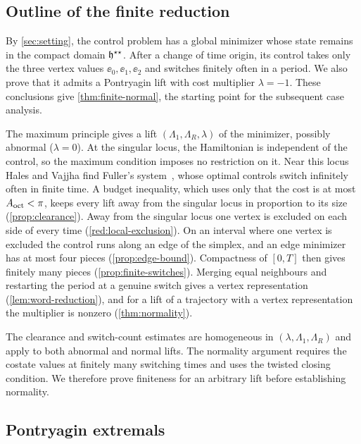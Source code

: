 \subsection{Outline of the finite reduction}\label{app:reduction-outline}

By \cref{sec:setting}, the control problem has a global minimizer whose state remains in the
compact domain $\mathfrak{h}^{\star\star}$. After a change of time origin, its control takes only the three
vertex values $\ee_0,\ee_1,\ee_2$ and switches finitely often in a period. We also prove that it
admits a Pontryagin lift with cost multiplier $\lambda=-1$. These conclusions give
\cref{thm:finite-normal}, the starting point for the subsequent case analysis.

The maximum principle gives a lift $(\Lambda_1,\Lambda_R,\lambda)$ of the minimizer, possibly
abnormal ($\lambda=0$). At the singular locus, the Hamiltonian is independent of the control, so
the maximum condition imposes no restriction on it. Near this locus Hales and Vajjha find Fuller's
system~\cite{HalesVajjha2024,Fuller1963}, whose optimal controls switch infinitely often in finite
time. A budget inequality, which uses only that the cost is at most $A_{\mathrm{oct}}<\pi$, keeps every lift
away from the singular locus in proportion to its size (\cref{prop:clearance}). Away from the
singular locus one vertex is excluded on each side of every time (\cref{red:local-exclusion}). On
an interval where one vertex is excluded the control runs along an edge of the simplex, and an
edge minimizer has at most four pieces (\cref{prop:edge-bound}). Compactness of $[0,T]$ then gives
finitely many pieces (\cref{prop:finite-switches}). Merging equal neighbours and restarting the
period at a genuine switch gives a vertex representation (\cref{lem:word-reduction}), and for a
lift of a trajectory with a vertex representation the multiplier is nonzero
(\cref{thm:normality}).

The clearance and switch-count estimates are homogeneous in $(\lambda,\Lambda_1,\Lambda_R)$ and
apply to both abnormal and normal lifts. The normality argument requires the costate values at
finitely many switching times and uses the twisted closing condition. We therefore prove
finiteness for an arbitrary lift before establishing normality.

\subsection{Pontryagin extremals}\label{red:extremals}

